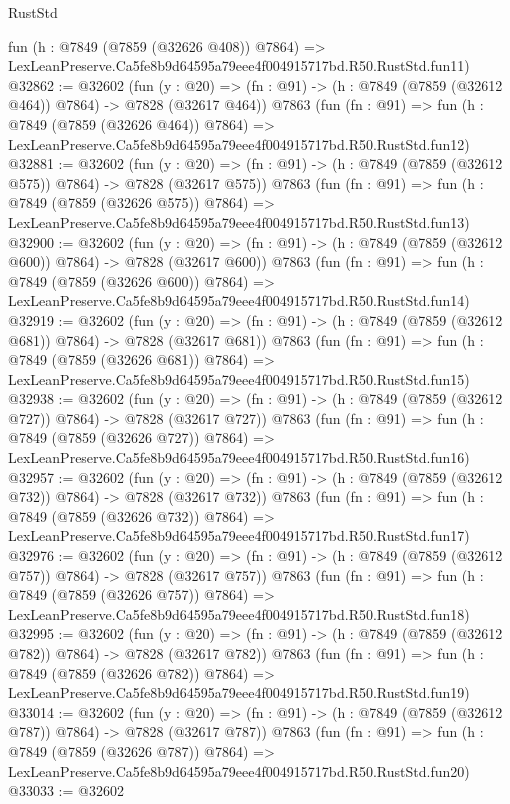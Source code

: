 \begin{lexlean}{RustStd}
\begin{coremodule}
    fun (h : @7849 (@7859 (@32626 @408)) @7864) =>
    LexLeanPreserve.Ca5fe8b9d64595a79eee4f004915717bd.R50.RustStd.fun11)
@32862 := @32602
    (fun (y : @20) => (fn : @91) -> (h : @7849 (@7859 (@32612 @464)) @7864) -> @7828 (@32617 @464))
    @7863
    (fun (fn : @91) =>
    fun (h : @7849 (@7859 (@32626 @464)) @7864) =>
    LexLeanPreserve.Ca5fe8b9d64595a79eee4f004915717bd.R50.RustStd.fun12)
@32881 := @32602
    (fun (y : @20) => (fn : @91) -> (h : @7849 (@7859 (@32612 @575)) @7864) -> @7828 (@32617 @575))
    @7863
    (fun (fn : @91) =>
    fun (h : @7849 (@7859 (@32626 @575)) @7864) =>
    LexLeanPreserve.Ca5fe8b9d64595a79eee4f004915717bd.R50.RustStd.fun13)
@32900 := @32602
    (fun (y : @20) => (fn : @91) -> (h : @7849 (@7859 (@32612 @600)) @7864) -> @7828 (@32617 @600))
    @7863
    (fun (fn : @91) =>
    fun (h : @7849 (@7859 (@32626 @600)) @7864) =>
    LexLeanPreserve.Ca5fe8b9d64595a79eee4f004915717bd.R50.RustStd.fun14)
@32919 := @32602
    (fun (y : @20) => (fn : @91) -> (h : @7849 (@7859 (@32612 @681)) @7864) -> @7828 (@32617 @681))
    @7863
    (fun (fn : @91) =>
    fun (h : @7849 (@7859 (@32626 @681)) @7864) =>
    LexLeanPreserve.Ca5fe8b9d64595a79eee4f004915717bd.R50.RustStd.fun15)
@32938 := @32602
    (fun (y : @20) => (fn : @91) -> (h : @7849 (@7859 (@32612 @727)) @7864) -> @7828 (@32617 @727))
    @7863
    (fun (fn : @91) =>
    fun (h : @7849 (@7859 (@32626 @727)) @7864) =>
    LexLeanPreserve.Ca5fe8b9d64595a79eee4f004915717bd.R50.RustStd.fun16)
@32957 := @32602
    (fun (y : @20) => (fn : @91) -> (h : @7849 (@7859 (@32612 @732)) @7864) -> @7828 (@32617 @732))
    @7863
    (fun (fn : @91) =>
    fun (h : @7849 (@7859 (@32626 @732)) @7864) =>
    LexLeanPreserve.Ca5fe8b9d64595a79eee4f004915717bd.R50.RustStd.fun17)
@32976 := @32602
    (fun (y : @20) => (fn : @91) -> (h : @7849 (@7859 (@32612 @757)) @7864) -> @7828 (@32617 @757))
    @7863
    (fun (fn : @91) =>
    fun (h : @7849 (@7859 (@32626 @757)) @7864) =>
    LexLeanPreserve.Ca5fe8b9d64595a79eee4f004915717bd.R50.RustStd.fun18)
@32995 := @32602
    (fun (y : @20) => (fn : @91) -> (h : @7849 (@7859 (@32612 @782)) @7864) -> @7828 (@32617 @782))
    @7863
    (fun (fn : @91) =>
    fun (h : @7849 (@7859 (@32626 @782)) @7864) =>
    LexLeanPreserve.Ca5fe8b9d64595a79eee4f004915717bd.R50.RustStd.fun19)
@33014 := @32602
    (fun (y : @20) => (fn : @91) -> (h : @7849 (@7859 (@32612 @787)) @7864) -> @7828 (@32617 @787))
    @7863
    (fun (fn : @91) =>
    fun (h : @7849 (@7859 (@32626 @787)) @7864) =>
    LexLeanPreserve.Ca5fe8b9d64595a79eee4f004915717bd.R50.RustStd.fun20)
@33033 := @32602

\end{coremodule}
\end{lexlean}
